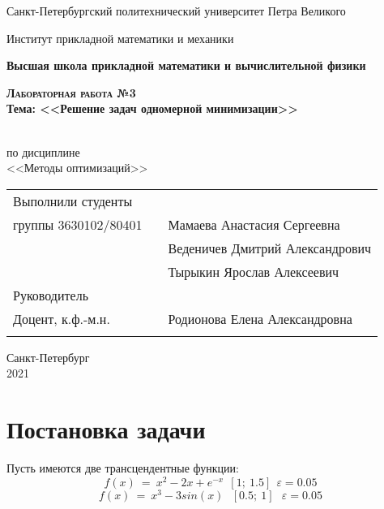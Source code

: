 \documentclass{article}
\begin{document}
\begin{titlepage}
  \begin{center}
  
     
    \large
    
    Санкт-Петербургский политехнический университет Петра Великого
    
    Институт прикладной математики и механики
    
    \textbf{Высшая школа прикладной математики и вычислительной физики}
    
    \vfill
     
     
    \textsc{\textbf{\Large{Лабораторная работа №3}}}\\[5mm]
     
    {\large \textbf{Тема: <<Решение задач одномерной минимизации>>}}
    
    \\ по дисциплине\\ <<Методы оптимизаций>>\\

\end{center}

\vfill


\begin{tabular}{l p{} l}
Выполнили студенты \\группы 3630102/80401   

&  &Мамаева Анастасия Сергеевна\\
&  &Веденичев Дмитрий Александрович\\
&  &Тырыкин Ярослав Алексеевич\\

Руководитель\\Доцент, к.ф.-м.н.& \hspace{0pt} &   Родионова Елена Александровна \\\\
\end{tabular}

\hfill \break
\hfill \break
\begin{center} Санкт-Петербург \\2021 \end{center}
\thispagestyle{empty}
 
\end{titlepage}
\newpage
\begin{center}
    \setcounter{page}{2}
    \tableofcontents  
\end{center}

\newpage
\section{Постановка задачи}
\noindent Пусть имеются две трансцендентные функции: 
$$f(x)~=~x^{2}-2x+e^{-x}~~[1;~1.5]~~\varepsilon=0.05$$
$$f(x)~=~x^{3}-3sin(x)~~~[0.5;~1]~~~\varepsilon=0.05 $$
\end{document}
